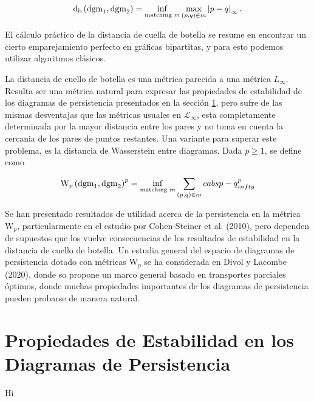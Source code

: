 \begin{equation*}
    \mathrm{d}_{\mathrm{b}}\left(\mathrm{dgm}_{1},\mathrm{dgm}_{2}\right) =
    \inf_{\text{matching }m}\max_{\left(p,q\right)\in m}\left|p-q\right|_{\infty}.
\end{equation*}

El c\'alculo pr\'actico de la distancia de cuella de botella se resume en
encontrar un cierto emparejamiento perfecto en gr\'aficas bipartitas, y para esto
podemos utilizar algoritmos cl\'asicos.

La distancia de cuello de botella es una m\'etrica parecida a una m\'etrica $\mathit{L}_{\infty}$.
Resulta ser una m\'etrica natural para expresar las propiedades de estabilidad de los
diagramas de persistencia presentados en la secci\'on \ref{sec: 4.7},
pero sufre de las mismas desventajas que las m\'etricas usuales en $\mathcal{L}_{\infty}$,
esta completamente determinada por la mayor distancia entre los pares
y no toma en cuenta la cercania de los pares de puntos restantes.
Una variante para superar este problema, es la distancia de Wasserstein entre diagramas.
Dada $p\geq 1$, se define como

\begin{equation*}
    \mathrm{W}_{p}\left(\mathrm{dgm}_{1},\mathrm{dgm}_{2}\right)^{p} =
    \inf_{\text{matching }m}\sum_{\left(p,q\right)\in m}cabs{p-q}_{infty}^{p}
\end{equation*}

Se han presentado resultados de utilidad acerca de la persistencia en la m\'etrica $\mathrm{W}_{p}$,
particularmente en el estudio por Cohen-Steiner et al. (2010)\cite{Cohen2010},
pero dependen de supuestos que los vuelve consecuencias de los resultados de estabilidad
en la distancia de cuello de botella.
Un estudia general del espacio de diagramas de persistencia dotado con m\'etricas
$\mathrm{W}_{p}$ se ha considerada en Divol y Lacombe (2020)\cite{Divol2021},
donde so propone un marco general basado en transportes parciales \'optimos,
donde muchas propiedades importantes de los diagramas de persistencia pueden probarse de manera natural.

\section{Propiedades de Estabilidad en los Diagramas de Persistencia}\label{sec: 4.7}

Hi